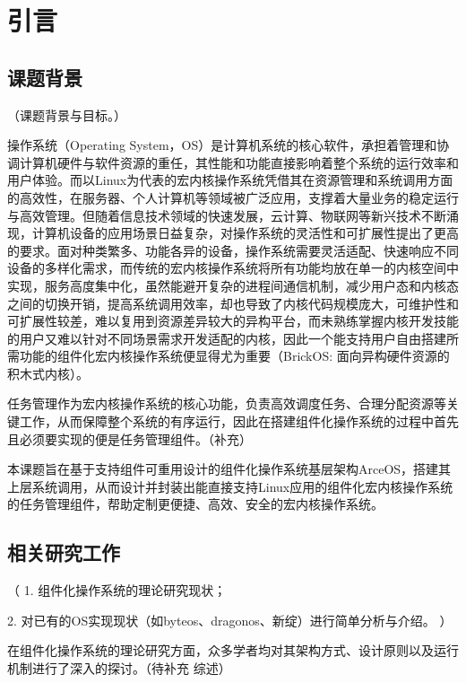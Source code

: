 
\chapter{引言}


\section{课题背景}

（课题背景与目标。）

操作系统（Operating System，OS）是计算机系统的核心软件，承担着管理和协调计算机硬件与软件资源的重任，其性能和功能直接影响着整个系统的运行效率和用户体验。而以Linux为代表的宏内核操作系统凭借其在资源管理和系统调用方面的高效性，在服务器、个人计算机等领域被广泛应用，支撑着大量业务的稳定运行与高效管理。但随着信息技术领域的快速发展，云计算、物联网等新兴技术不断涌现，计算机设备的应用场景日益复杂，对操作系统的灵活性和可扩展性提出了更高的要求。面对种类繁多、功能各异的设备，操作系统需要灵活适配、快速响应不同设备的多样化需求，而传统的宏内核操作系统将所有功能均放在单一的内核空间中实现，服务高度集中化，虽然能避开复杂的进程间通信机制，减少用户态和内核态之间的切换开销，提高系统调用效率，却也导致了内核代码规模庞大，可维护性和可扩展性较差，难以复用到资源差异较大的异构平台，而未熟练掌握内核开发技能的用户又难以针对不同场景需求开发适配的内核，因此一个能支持用户自由搭建所需功能的组件化宏内核操作系统便显得尤为重要（BrickOS: 面向异构硬件资源的积木式内核）。

任务管理作为宏内核操作系统的核心功能，负责高效调度任务、合理分配资源等关键工作，从而保障整个系统的有序运行，因此在搭建组件化操作系统的过程中首先且必须要实现的便是任务管理组件。（补充）

本课题旨在基于支持组件可重用设计的组件化操作系统基层架构ArceOS，搭建其上层系统调用，从而设计并封装出能直接支持Linux应用的组件化宏内核操作系统的任务管理组件，帮助定制更便捷、高效、安全的宏内核操作系统。



\section{相关研究工作}

（
1. 组件化操作系统的理论研究现状；

2. 对已有的OS实现现状（如byteos、dragonos、新绽）进行简单分析与介绍。
）

在组件化操作系统的理论研究方面，众多学者均对其架构方式、设计原则以及运行机制进行了深入的探讨。（待补充 综述）

